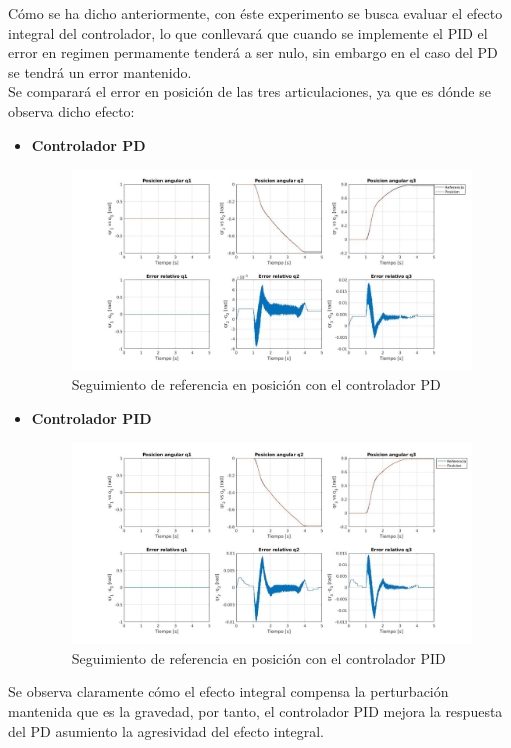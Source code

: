 Cómo se ha dicho anteriormente, con éste experimento se busca evaluar el efecto integral del controlador, lo que conllevará que cuando se implemente el PID el error en regimen permamente tenderá a ser nulo, sin embargo en el caso del PD se tendrá un error mantenido.\\
Se comparará el error en posición de las tres articulaciones, ya que es dónde se observa dicho efecto:
\begin{itemize}
	\item \textbf{Controlador PD}

	\begin{figure}[h!]
		\centering
		\includegraphics[width=.8\textwidth]{exp1_posPD}
		\caption{Seguimiento de referencia en posición con el controlador PD}
	\end{figure}

\newpage
	\item \textbf{Controlador PID}
	\begin{figure}[h!]
		\centering
		\includegraphics[width=.8\textwidth]{exp1_posPID}
		\caption{Seguimiento de referencia en posición con el controlador PID}
	\end{figure}

\end{itemize}

Se observa claramente cómo el efecto integral compensa la perturbación mantenida que es la gravedad, por tanto, el controlador PID mejora la respuesta del PD asumiento la agresividad del efecto integral.

